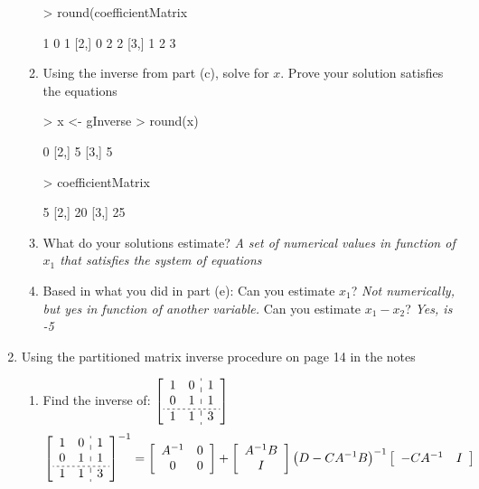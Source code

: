 \documentclass[12pt,a4paper]{paper}
\begin{document}
\begin{enumerate}
\begin{enumerate}
\begin{Schunk}
\begin{Sinput}
> round(coefficientMatrix %*% gInverse %*% coefficientMatrix)
\end{Sinput}
\begin{Soutput}
     [,1] [,2] [,3]
[1,]    1    0    1
[2,]    0    2    2
[3,]    1    2    3
\end{Soutput}
\end{Schunk}
\item Using the inverse from part (c), solve for $x$. Prove your solution satisfies the equations
\begin{Schunk}
\begin{Sinput}
> x <- gInverse %*% c(5, 20, 25)
> round(x)
\end{Sinput}
\begin{Soutput}
     [,1]
[1,]    0
[2,]    5
[3,]    5
\end{Soutput}
\begin{Sinput}
> coefficientMatrix %*% x
\end{Sinput}
\begin{Soutput}
     [,1]
[1,]    5
[2,]   20
[3,]   25
\end{Soutput}
\end{Schunk}
\item What do your solutions estimate? \emph{A set of numerical values in function of $x_{1}$ that satisfies the system of equations}
\item Based in what you did in part (e): Can you estimate $x_{1}$? \emph{Not numerically, but yes in function of another variable.} Can you estimate $x_{1} - x_{2}$? \emph{Yes, is -5}
\end{enumerate}
\item Using the partitioned matrix inverse procedure on page 14 in the notes
\begin{enumerate}
\item Find the inverse of: $\left[\begin{array}{cc:c}1&0&1\\0&1&1\\\hdashline[2pt/2pt]1&1&3\end{array}\right]$
\begin{align*}
\left[\begin{array}{cc:c}1&0&1\\0&1&1\\\hdashline[2pt/2pt]1&1&3\end{array}\right]^{-1} &= \left[\begin{array}{cc}A^{-1}&0\\0&0\end{array}\right] + \left[\begin{array}{c}A^{-1}B\\I\end{array}\right]\left(D-CA^{-1}B\right)^{-1}\left[\begin{array}{cc}-CA^{-1}&I\end{array}\right]\\

\end{align*}
\end{enumerate}
\end{enumerate}
\end{document}
